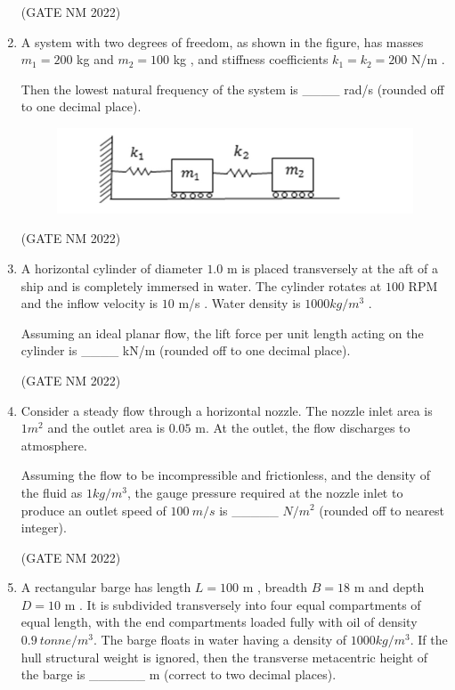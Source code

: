 \documentclass[journal,12pt,onecolumn]{IEEEtran}
\theoremstyle{remark}
\begin{document}
\begin{enumerate}
\hfill(GATE NM 2022)





\item 
A system with two degrees of freedom, as shown in the figure, has masses  
$m_1 = 200$ kg and $m_2 = 100$ kg , and stiffness coefficients  
$k_1 = k_2 = 200$ N/m .  

Then the lowest natural frequency of the system is  
\_\_\_\_  rad/s  (rounded off to one decimal place).


 \begin{figure}[h]
	 \centering
	 \includegraphics[width=0.3\columnwidth]{fig10}
	 \caption{}
	 \label{fig:placeholder}
 \end{figure}

 \hfill(GATE NM 2022)

\item   
A horizontal cylinder of diameter $1.0$ m  is placed transversely at the aft of a ship and is completely immersed in water.  
The cylinder rotates at $100$ RPM  and the inflow velocity is $10$ m/s . Water density is $1000 kg/m^3 $ .  

Assuming an ideal planar flow, the lift force per unit length acting on the cylinder is  
\_\_\_\_  kN/m (rounded off to one decimal place).


\hfill(GATE NM 2022)



\item  
Consider a steady flow through a horizontal nozzle.  
The nozzle inlet area is $1 m^2 $  and the outlet area is $0.05$ m.  
At the outlet, the flow discharges to atmosphere.  

Assuming the flow to be incompressible and frictionless, and the density of the fluid as  
$1  kg/m^3$, the gauge pressure required at the nozzle inlet to produce an outlet speed  
of $100\ m/s $ is \_\_\_\_\_ $  N/m^2 $ (rounded off to nearest integer).

\hfill(GATE NM 2022)





\item 
A rectangular barge has length $L = 100$ m , breadth $B = 18 $ m  and depth $D = 10$ m .  
It is subdivided transversely into four equal compartments of equal length, with the end compartments loaded fully with oil of density $0.9\ tonne/m^3 $.  
The barge floats in water having a density of $1000  kg/m^3 $.  
If the hull structural weight is ignored, then the transverse metacentric height of the barge is  
\_\_\_\_\_\_  m (correct to two decimal places).


\end{enumerate}
\end{document}
